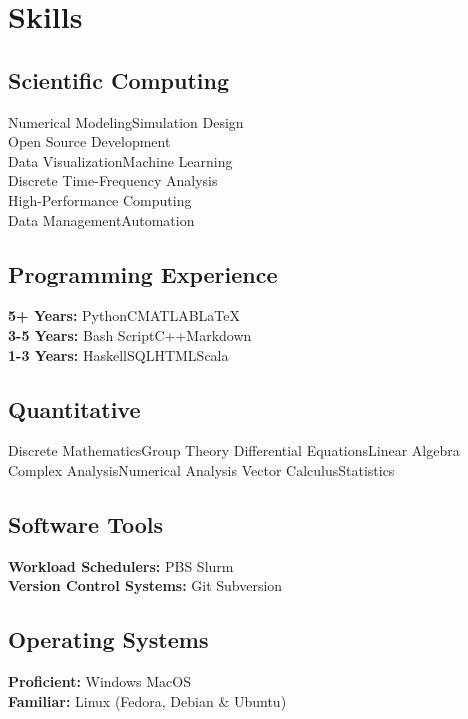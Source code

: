 \documentclass[letterpaper]{radler-resume-class}
\begin{document}
\begin{minipage}[t]{0.32\textwidth}
\section{Skills}
\sectionspace
\subsection{Scientific Computing}
Numerical Modeling\textbullet{}Simulation Design\\
\textbullet{}Open Source Development\\
\textbullet{}Data Visualization\textbullet{}Machine Learning\\
\textbullet{}Discrete Time-Frequency Analysis\\
\textbullet{}High-Performance Computing\\
\textbullet{}Data Management\textbullet{}Automation

\sectionspace

\subsection{Programming Experience}
\textbf{5+ Years:} Python\textbullet{}C\textbullet{}MATLAB\textbullet{}\LaTeX\\
\textbf{3-5 Years:} Bash Script\textbullet{}C++\textbullet{}Markdown\\
\textbf{1-3 Years:} Haskell\textbullet{}SQL\textbullet{}HTML\textbullet{}Scala

\sectionspace

\subsection{Quantitative}
Discrete Mathematics\textbullet{}Group Theory
\textbullet{}Differential Equations\textbullet{}Linear Algebra
\textbullet{}Complex Analysis\textbullet{}Numerical Analysis
\textbullet{}Vector Calculus\textbullet{}Statistics

\sectionspace

\subsection{Software Tools}
\textbf{Workload Schedulers:} PBS \textbullet{} Slurm\\
\textbf{Version Control Systems:} Git \textbullet{} Subversion

\sectionspace

\subsection{Operating Systems}
\textbf{Proficient:} Windows \textbullet{} MacOS\\
\textbf{Familiar:} Linux (Fedora, Debian \& Ubuntu)

\end{minipage} %
\end{document}
